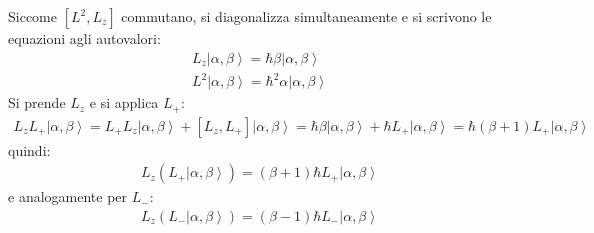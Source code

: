 Siccome $\left[L^2,L_z\right]$ commutano, si diagonalizza simultaneamente e si scrivono le equazioni agli autovalori:
\begin{equation}\begin{split}
L_z\left |\alpha,\beta \right\rangle=\hbar\beta\left |\alpha,\beta \right\rangle \\
L^2\left |\alpha,\beta \right\rangle=\hbar ^2\alpha\left |\alpha,\beta \right\rangle
\end{split}\end{equation}
Si prende $L_z$ e si applica $L_+$:
\begin{equation}\begin{split}
L_zL_+\left |\alpha,\beta \right\rangle=L_+L_z\left |\alpha,\beta \right\rangle+\left[L_z,L_+\right]\left |\alpha,\beta \right\rangle=\hbar \beta\left |\alpha,\beta \right\rangle+\hbar L_+\left |\alpha,\beta \right\rangle=\hbar \left(\beta+1\right)L_+\left |\alpha,\beta \right\rangle
\end{split}\end{equation}
quindi:
\begin{equation}\begin{split}
L_z\left(L_+\left |\alpha,\beta \right\rangle\right)=\left(\beta+1\right)\hbar L_+\left |\alpha,\beta \right\rangle
\end{split}\end{equation}
e analogamente per $L_-$:
\begin{equation}\begin{split}
L_z\left(L_-\left |\alpha,\beta \right\rangle\right)=\left(\beta-1\right)\hbar L_-\left |\alpha,\beta \right\rangle
\end{split}\end{equation}

